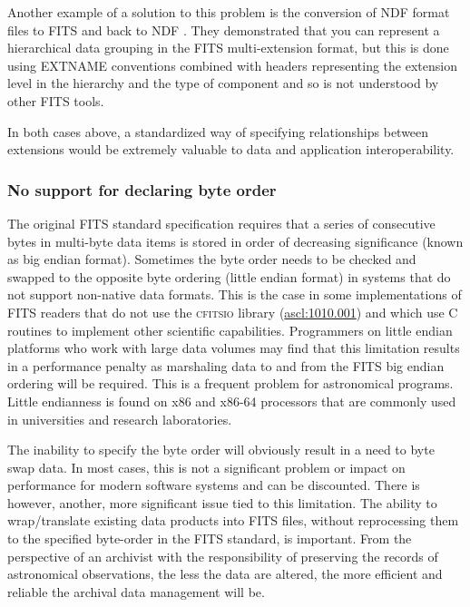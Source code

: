 \documentclass[final,authoryear,5p,times,twocolumn]{elsarticle}
\begin{document}
{{Another example of a solution to this problem is the conversion of NDF
format files to FITS and back to NDF \citep{SUN55,1997STARB..19...14C}.
They demonstrated that you can represent a hierarchical data grouping
in the FITS multi-extension format, but this is done using EXTNAME
conventions combined with headers representing the extension level in
the hierarchy and the type of component and so is not understood by
other FITS tools.

In both cases above, a standardized way of specifying relationships
between extensions would be extremely valuable to data and application interoperability.


\subsubsection{No support for declaring byte order}
\label{section_byte_order}

The original FITS standard specification \citep{1981A&AS...44..363W}
requires that a series of consecutive bytes in multi-byte data items is
stored in order of decreasing significance (known as big endian format).
Sometimes the byte order needs to be checked and swapped to the opposite
byte ordering (little endian format) in systems that do not support
non-native data formats.  This is the case in some implementations of FITS
readers that do not use the \textsc{cfitsio} library
(\href{http://ascl.net/1010.001}{ascl:1010.001}) and which use C routines
to implement other scientific capabilities.  Programmers on little endian
platforms who work with large data volumes may find that this limitation
results in a performance penalty as marshaling data to and from
the FITS big endian ordering will be required.  This is a frequent problem
for astronomical programs. Little endianness is found on x86 and x86-64
processors that are commonly used in universities and research
laboratories.


The inability to specify the byte order will obviously result in a
need to byte swap data. In most cases, this is not a significant
problem or impact on performance for modern software systems and
can be discounted. There is however, another, more significant issue
tied to this limitation. The ability to wrap/translate existing data products
into FITS files, without reprocessing them to the specified
byte-order in the FITS standard, is important. From
the perspective of an archivist with the responsibility of preserving the
records of astronomical observations, the less the data are altered, the
more efficient and reliable the archival data management will be.


}}
\end{document}
